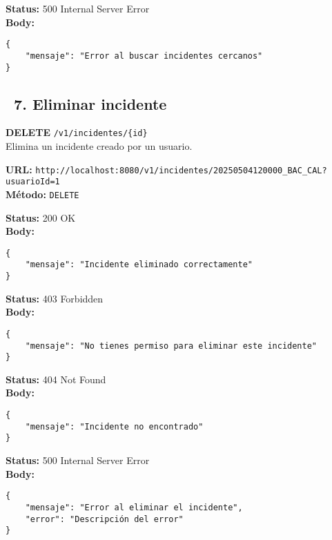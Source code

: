 \begin{tcolorbox}[response]
    \textbf{Status:} 500 Internal Server Error\\
    \textbf{Body:}
    \begin{verbatim}
{
    "mensaje": "Error al buscar incidentes cercanos"
}
    \end{verbatim}
\end{tcolorbox}

\subsection*{\faServer\ 7. Eliminar incidente}
\begin{tcolorbox}[endpoint]
    \textbf{DELETE} \texttt{/v1/incidentes/\{id\}}\\
    Elimina un incidente creado por un usuario.
\end{tcolorbox}

\begin{tcolorbox}[request]
    \textbf{URL:} \textcolor{urlColor}{\texttt{http://localhost:8080/v1/incidentes/20250504120000\_BAC\_CAL?usuarioId=1}}\\
    \textbf{Método:} \textcolor{methodColor}{\texttt{DELETE}}
\end{tcolorbox}

\begin{tcolorbox}[response]
    \textbf{Status:} 200 OK\\
    \textbf{Body:}
    \begin{verbatim}
{
    "mensaje": "Incidente eliminado correctamente"
}
    \end{verbatim}
\end{tcolorbox}

\begin{tcolorbox}[response]
    \textbf{Status:} 403 Forbidden\\
    \textbf{Body:}
    \begin{verbatim}
{
    "mensaje": "No tienes permiso para eliminar este incidente"
}
    \end{verbatim}
\end{tcolorbox}

\begin{tcolorbox}[response]
    \textbf{Status:} 404 Not Found\\
    \textbf{Body:}
    \begin{verbatim}
{
    "mensaje": "Incidente no encontrado"
}
    \end{verbatim}
\end{tcolorbox}

\begin{tcolorbox}[response]
    \textbf{Status:} 500 Internal Server Error\\
    \textbf{Body:}
    \begin{verbatim}
{
    "mensaje": "Error al eliminar el incidente",
    "error": "Descripción del error"
}
    \end{verbatim}
\end{tcolorbox}